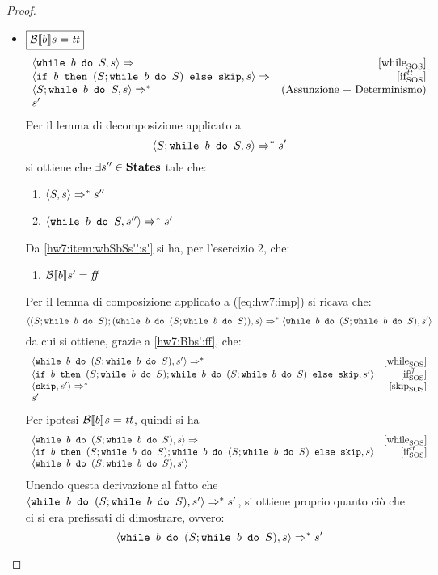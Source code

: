 {\begin{proof}
\begin{itemize}
	\item $\boxed{\B{b} = \semtrue}$
	$$
	\begin{array}{lr}
	\confSs{\wbS{b}{S}}{s} \Rar{ }  & \whileSOS \\
	\confSs{\ifABC{b}{(S;\wbS{b}{S})}{\skipForFriends}}{s} \Rar{ } & \ifttSOS\\
	\confSs{S; \wbS{b}{S}}{s} \Rar{*} & (\text{Assunzione + Determinismo})\\
	s'
	\end{array}
	$$
	Per il lemma di decomposizione applicato a
	\begin{equation}
	\confSs{S; \wbS{b}{S}}{s} \Rar{*} s'
		\label{eq:hw7:imp}
	\end{equation}
	si ottiene che $\exists s'' \in \states$ tale che: 
	\begin{enumerate}[label=(\alph*)]
		\item $\confSs{S}{s} \Rar{*} s''$
		\item $\confSs{\wbS{b}{S}}{s''} \Rar{*} s'$
		\label{hw7:item:wbSbSs'':s'}
	\end{enumerate}
	Da \ref{hw7:item:wbSbSs'':s'} si ha, per l'esercizio 2, che:
	\begin{enumerate}[label=(\Roman*)]
		\item $\B{b}' = \semfalse$
		\label{hw7:Bbs':ff}
	\end{enumerate}  
	Per il lemma di composizione applicato a (\ref{eq:hw7:imp}) si ricava che:
	$$
	\confSs{(S; \wbS{b}{S}); (\wbS{b}{(S; \wbS{b}{S})})}{s} \Rar{*} \confSs{\wbS{b}{(S; \wbS{b}{S})}}{s'} 
	$$
	da cui si ottiene, grazie a \ref{hw7:Bbs':ff}, che:
	$$
	\begin{array}{lr}
	\confSs{\wbS{b}{(S; \wbS{b}{S})}}{s'} \Rar{*} & \whileSOS\\
	\confSs{\ifABC{b}{(S; \wbS{b}{S}); \wbS{b}{(S; \wbS{b}{S})}}{\skipForFriends}}{s'} & \ifffSOS\\
	\confSs{\skipForFriends}{s'} \Rar{*} & \skipSOS\\
	s' & \\
	\label{hw:arary}
	\end{array}
	$$  
	Per ipotesi $\B{b} = \semtrue$, quindi si ha
	$$
	\begin{array}{lr}
	\confSs{\wbS{b}{(S; \wbS{b}{S})}}{s} \Rar{ } & \whileSOS\\
	\confSs{\ifABC{b}{(S; \wbS{b}{S}); \wbS{b}{(S; \wbS{b}{S})}}{\skipForFriends}}{s} & \ifttSOS \\
	\confSs{\wbS{b}{(S; \wbS{b}{S})}}{s'} & 
	\end{array}
	$$
	Unendo questa derivazione al fatto che
	$\confSs{\wbS{b}{(S; \wbS{b}{S})}}{s'} \Rar{*} s'$, si ottiene
	proprio quanto ciò che ci si era prefissati di dimostrare, ovvero:
	$$
	\confSs{\wbS{b}{(S; \wbS{b}{S})}}{s} \Rar{*} s'
	$$
\end{itemize}


\end{proof}}
